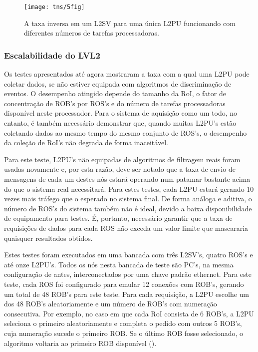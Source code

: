 \begin{figure}
\begin{center}
\texttt{[image: tns/5fig]}
\end{center}
\caption{A taxa inversa em um L2SV para uma única L2PU funcionando com
diferentes números de tarefas processadoras.}
\label{fig:tns-5fig}
\end{figure}

\subsubsection{Escalabilidade do LVL2}

Os testes apresentados até agora mostraram a taxa com a qual uma L2PU pode
coletar dados, se não estiver equipada com algoritmos de discriminação de
eventos. O desempenho atingido depende do tamanho da RoI, o fator de
concentração de ROB's por ROS's e do número de tarefas processadoras
disponível neste processador. Para o sistema de aquisição como um todo, no
entanto, é também necessário demonstrar que, quando muitas L2PU's estão
coletando dados ao mesmo tempo do mesmo conjunto de ROS's, o desempenho da
coleção de RoI's não degrada de forma inaceitável.

Para este teste, L2PU's não equipadas de algoritmos de filtragem reais foram
usadas novamente e, por esta razão, deve ser notado que a taxa de envio de
mensagens de cada um destes nós estará operando num patamar bastante acima do
que o sistema real necessitará. Para estes testes, cada L2PU estará gerando 10
vezes mais tráfego que o esperado no sistema final. De forma análoga e
aditiva, o número de ROS's do sistema também não é ideal, devido a baixa
disponibilidade de equipamento para testes. É, portanto, necessário garantir
que a taxa de requisições de dados para cada ROS não exceda um valor limite
que mascararia quaisquer resultados obtidos.

Estes testes foram executados em uma bancada com três L2SV's, quatro ROS's e
até onze L2PU's. Todos os nós nesta bancada de teste são PC's, na mesma
configuração de antes, interconectados por uma chave padrão 
ethernet. Para este teste, cada ROS foi configurado para emular 12 conexões
com ROB's, gerando um total de 48 ROB's para este teste. Para cada requisição,
a L2PU escolhe um dos 48 ROB's aleatoriamente e um número de ROB's com
numeração consecutiva. Por exemplo, no caso em que cada RoI consista de 6
ROB's, a L2PU seleciona o primeiro aleatoriamente e completa o pedido com
outros 5 ROB's, cuja numeração sucede o primeiro ROB. Se o último ROB fosse
selecionado, o algoritmo voltaria ao primeiro ROB disponível
().

